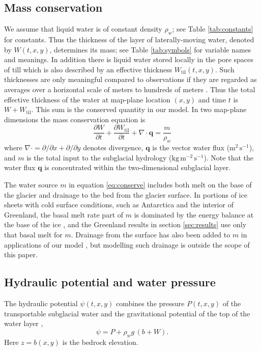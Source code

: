 \documentclass[gmd]{copernicus}   %
\newcommand{\text}{\textrm}
\newcommand\bq{\mathbf{q}}
\newcommand{\Div}{\nabla\cdot}
\newcommand{\Wtil}{W_{\text{til}}}
\begin{document}
\subsection{Mass conservation}  We assume that liquid water is of constant density $\rho_w$; see Table \ref{tab:constants} for constants.  Thus the thickness of the layer of laterally-moving water, denoted by $W(t,x,y)$, determines its mass; see Table \ref{tab:symbols} for variable names and meanings.  In addition there is liquid water stored locally in the pore spaces of till \citep{Tulaczyketal2000b} which is also described by an effective thickness $\Wtil(t,x,y)$.  Such thicknesses are only meaningful compared to observations if they are regarded as averages over a horizontal scale of meters to hundreds of meters \citep{FlowersClarke2002_theory}.  Thus the total effective thickness of the water at map-plane location $(x,y)$ and time $t$ is $W + \Wtil$.  This sum is the conserved quantity in our model.  In two map-plane dimensions the mass conservation equation is \citep[compare][]{Clarke05}
\begin{equation} \label{eq:conserve}
\frac{\partial W}{\partial t} + \frac{\partial \Wtil}{\partial t} + \Div \bq = \frac{m}{\rho_w}
\end{equation}
where $\Div = \partial/\partial x + \partial/\partial y$ denotes divergence, $\bq$ is the vector water flux ($\text{m}^2\,\text{s}^{-1}$), and $m$ is the total input to the subglacial hydrology ($\text{kg}\,\text{m}^{-2}\,\text{s}^{-1}$).  Note that the water flux $\bq$ is concentrated within the two-dimensional subglacial layer.

The water source $m$ in equation \eqref{eq:conserve} includes both melt on the base of the glacier and drainage to the bed from the glacier surface.  In portions of ice sheets with cold surface conditions, such as Antarctica and the interior of Greenland, the basal melt rate part of $m$ is dominated by the energy balance at the base of the ice \citep{AschwandenBuelerKhroulevBlatter}, and the Greenland results in section \ref{sec:results} use only that basal melt for $m$.  Drainage from the surface has also been added to $m$ in applications of our model \citep{vanPeltthesis}, but modelling such drainage is outside the scope of this paper.

\subsection{Hydraulic potential and water pressure}  The  hydraulic potential $\psi(t,x,y)$ combines the pressure $P(t,x,y)$ of the transportable subglacial water and the gravitational potential of the top of the water layer \citep{Goelleretal2013,Hewittetal2012},
\begin{equation} \label{eq:potential}
\psi = P + \rho_w g\, (b+W).
\end{equation}
Here $z=b(x,y)$ is the bedrock elevation.
\end{document}
